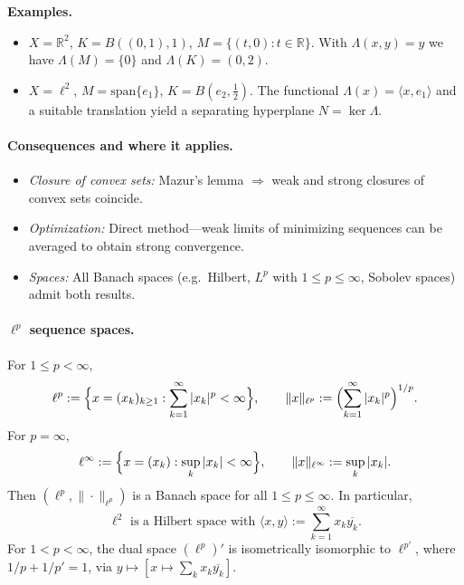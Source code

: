 \documentclass[12pt,a4paper]{article}
\theoremstyle{plain}
\theoremstyle{definition}
\theoremstyle{remark}
\theoremstyle{remark}
\theoremstyle{definition}
\begin{document}
	\textbf{Examples.}
	\begin{itemize}
		\item $X=\mathbb R^2$, $K=B((0,1),1)$, $M=\{(t,0):t\in\mathbb R\}$. 
		With $\Lambda(x,y)=y$ we have $\Lambda(M)=\{0\}$ and $\Lambda(K)=(0,2)$.
		\item $X=\ell^2$, $M=\mathrm{span}\{e_1\}$, $K=B(e_2,\tfrac12)$. 
		The functional $\Lambda(x)=\langle x,e_1\rangle$ and a suitable translation yield a separating hyperplane $N=\ker\Lambda$.
	\end{itemize}
	
	\bigskip
	\paragraph{Consequences and where it applies.}
	\begin{itemize}
		\item \emph{Closure of convex sets:} Mazur’s lemma $\Rightarrow$ weak and strong closures of convex sets coincide.
		\item \emph{Optimization:} Direct method—weak limits of minimizing sequences can be averaged to obtain strong convergence.
		\item \emph{Spaces:} All Banach spaces (e.g.\ Hilbert, $L^p$ with $1\le p\le\infty$, Sobolev spaces) admit both results.
	\end{itemize}
	
	\paragraph{$\ell^p$ sequence spaces.}
	For $1\le p<\infty$,
	\[
	\ell^p := \Bigl\{ x=(x_k)_{k\ge1} : \sum_{k=1}^{\infty} |x_k|^p < \infty \Bigr\},
	\qquad
	\|x\|_{\ell^p} := \Bigl( \sum_{k=1}^{\infty} |x_k|^p \Bigr)^{1/p}.
	\]
	For $p=\infty$,
	\[
	\ell^\infty := \Bigl\{ x=(x_k): \sup_{k} |x_k| < \infty \Bigr\},
	\qquad
	\|x\|_{\ell^\infty} := \sup_{k} |x_k|.
	\]
	Then $(\ell^p,\|\cdot\|_{\ell^p})$ is a Banach space for all $1\le p\le\infty$.
	In particular,
	\[
	\ell^2 \text{ is a Hilbert space with } 
	\langle x,y\rangle := \sum_{k=1}^\infty x_k \overline{y_k}.
	\]
	For $1<p<\infty$, the dual space $(\ell^p)'$ is isometrically isomorphic to $\ell^{p'}$,
	where $1/p+1/p'=1$, via $y\mapsto[x\mapsto \sum_k x_k \overline{y_k}]$.
	
\end{document}
